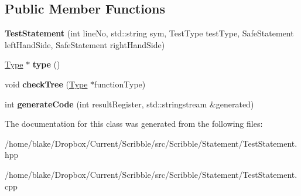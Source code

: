 \subsection*{Public Member Functions}
\begin{DoxyCompactItemize}
\item 
\hypertarget{class_scribble_core_1_1_test_statement_a60fca3989943a31b91ca2d1b6d8aede7}{{\bfseries Test\-Statement} (int line\-No, std\-::string sym, Test\-Type test\-Type, Safe\-Statement left\-Hand\-Side, Safe\-Statement right\-Hand\-Side)}\label{class_scribble_core_1_1_test_statement_a60fca3989943a31b91ca2d1b6d8aede7}

\item 
\hypertarget{class_scribble_core_1_1_test_statement_a4460d4d4d0167f81dabdcc29aa75271d}{\hyperlink{class_scribble_core_1_1_type}{Type} $\ast$ {\bfseries type} ()}\label{class_scribble_core_1_1_test_statement_a4460d4d4d0167f81dabdcc29aa75271d}

\item 
\hypertarget{class_scribble_core_1_1_test_statement_a26bad2e7c3f0ac61349e7c634a50ed62}{void {\bfseries check\-Tree} (\hyperlink{class_scribble_core_1_1_type}{Type} $\ast$function\-Type)}\label{class_scribble_core_1_1_test_statement_a26bad2e7c3f0ac61349e7c634a50ed62}

\item 
\hypertarget{class_scribble_core_1_1_test_statement_ab66075eb5fceaa849ba4bd5a7b059180}{int {\bfseries generate\-Code} (int result\-Register, std\-::stringstream \&generated)}\label{class_scribble_core_1_1_test_statement_ab66075eb5fceaa849ba4bd5a7b059180}

\end{DoxyCompactItemize}


The documentation for this class was generated from the following files\-:\begin{DoxyCompactItemize}
\item 
/home/blake/\-Dropbox/\-Current/\-Scribble/src/\-Scribble/\-Statement/Test\-Statement.\-hpp\item 
/home/blake/\-Dropbox/\-Current/\-Scribble/src/\-Scribble/\-Statement/Test\-Statement.\-cpp\end{DoxyCompactItemize}
